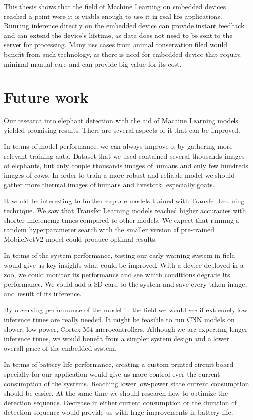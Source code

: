 This thesis shows that the field of Machine Learning on embedded devices reached a point were it is viable enough to use it in real life applications.
Running inference directly on the embedded device can provide instant feedback and can extend the device's lifetime, as data does not need to be sent to the server for processing.
Many use cases from animal conservation filed would benefit from such technology, as there is need for embedded device that require minimal manual care and can provide big value for its cost.


\section{ Future work}

Our research into elephant detection with the aid of Machine Learning models yielded promising results.
There are several aspects of it that can be improved.

In terms of model performance, we can always improve it by gathering more relevant training data.
Dataset that we used contained several thousands images of elephants, but only couple thousands images of humans and only few hundreds images of cows.
In order to train a more robust and reliable model we should gather more thermal images of humans and livestock, especially goats.

It would be interesting to further explore models trained with Transfer Learning technique.
We saw that Transfer Learning models reached higher accuracies with shorter inferencing times compared to other models.
We expect that running a random hyperparameter search with the smaller version of pre-trained MobileNetV2 model could produce optimal results.

In terms of the system performance, testing our early warning system in field would give us key insights what could be improved.
With a device deployed in a zoo, we could monitor its performance and see which conditions degrade its performance.
We could add a SD card to the system and save every taken image, and result of its inference.

By observing performance of the model in the field we would see if extremely low inference times are really needed.
It might be feasible to run CNN models on slower, low-power, Cortex-M4 microcontrollers.
Although we are expecting longer inference times, we would benefit from a simpler system design and a lower overall price of the embedded system.

In terms of battery life performance, creating a custom printed circuit board specially for our application would give us more control over the current consumption of the systems. Reaching lower low-power state current consumption should be easier.
At the same time we should research how to optimize the detection sequence. 
Decrease in either current consumption or the duration of detection sequence would provide us with huge improvements in battery life.


